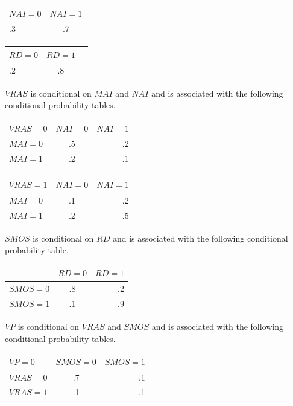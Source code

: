 \documentclass[solution, letterpaper]{cs121}
\begin{document}
\begin{empfile}
\begin{center}
\begin{tabular}{ l |c r }
   $NAI = 0$ & $NAI = 1$ \\
   \hline
  .3 & .7 \\
\end{tabular}
\end{center}

\begin{center}
\begin{tabular}{ l |c r }
   $RD = 0$ & $RD = 1$ \\
   \hline
  .2 & .8 \\
\end{tabular}
\end{center}

$VRAS$ is conditional on $MAI$ and $NAI$ and is associated with the following conditional probability tables.
\begin{center}
\begin{tabular}{ l |c r }
   $VRAS = 0$ & $NAI = 0$ & $NAI = 1$ \\
   \hline
  $MAI = 0$ & .5 & .2 \\
  $MAI = 1$ & .2 & .1 \\
\end{tabular}
\end{center}

\begin{center}
\begin{tabular}{ l |c r }
   $VRAS = 1$ & $NAI = 0$ & $NAI = 1$ \\
   \hline
  $MAI = 0$ & .1 & .2 \\
  $MAI = 1$ & .2 & .5 \\
\end{tabular}
\end{center}

$SMOS$ is conditional on $RD$ and is associated with the following conditional probability table.
\begin{center}
\begin{tabular}{ l |c r }
   & $RD = 0$ & $RD = 1$ \\
   \hline
  $SMOS = 0$ & .8 & .2 \\
  $SMOS = 1$ & .1 & .9 \\
\end{tabular}
\end{center}

$VP$ is conditional on $VRAS$ and $SMOS$ and is associated with the following conditional probability tables.
\begin{center}
\begin{tabular}{ l |c r }
   $VP = 0$ & $SMOS = 0$ & $SMOS = 1$ \\
   \hline
  $VRAS = 0$ & .7 & .1 \\
  $VRAS = 1$ & .1 & .1 \\
\end{tabular}
\end{center}


\end{empfile}
\end{document}
